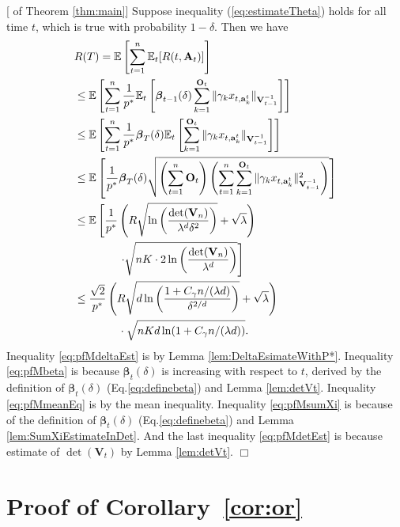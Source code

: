 \documentclass{article}
\newcommand{\bbeta}{\boldsymbol{\beta}}
\newcommand{\EE}{\mathbb{E}}
\newcommand{\bA}{\mathbf{A}}
\newcommand{\ba}{\mathbf{a}}
\newcommand{\bO}{\mathbf{O}}
\newcommand{\bV}{\mathbf{V}}
\newcommand{\norm}[1]{\| #1 \|}
\newenvironment{proof}{\noindent {\textbf{Proof. }}}{$\Box$ \medskip}
\begin{document}
\begin{proof}[ of Theorem \ref{thm:main}]
	Suppose inequality (\ref{eq:estimateTheta}) holds for all time $t$, which is true with probability $1-\delta$. Then we have
	\begin{align}
	&R(T) = \EE \left[\sum_{t=1}^{n} \EE_{t}[R(t, \bA_t)] \right] \notag\\
	&\leq \EE\left[\sum_{t=1}^{n} \frac{1}{p^*} \EE_t \left[\bbeta_{t-1}(\delta) \sum_{k=1}^{\bO_t}\norm{\gamma_k x_{t,\ba_k^t}}_{\bV_{t-1}^{-1}}\right] \right] \label{eq:pfMdeltaEst}\\
	&\leq \EE\left[\sum_{t=1}^{n} \frac{1}{p^*} \bbeta_{T}(\delta) \EE_t \left[ \sum_{k=1}^{\bO_t}\norm{\gamma_k x_{t,\ba_k^t}}_{\bV_{t-1}^{-1}}\right] \right] \label{eq:pfMbeta}\\
	&\leq \EE \left[\frac{1}{p^*} \bbeta_T(\delta) \sqrt{\left(\sum_{t=1}^{n} \bO_t\right) \left( \sum_{t=1}^{n} \sum_{k=1}^{\bO_t}\norm{\gamma_k x_{t,\ba_k^t}}_{\bV_{t-1}^{-1}}^2 \right)} \right ]  \label{eq:pfMmeanEq}\\
	&\leq \EE\left[\frac{1}{p^*} \left( R \sqrt{ \ln \left( \frac{\det(\bV_n)}{\lambda^d \delta^2} \right)} + \sqrt{\lambda} \right) \right. \notag\\
	& \left. \qquad \qquad \cdot \sqrt{nK \cdot 2\ln \left(\frac{\det(\bV_n)}{\lambda^d} \right)} \right] \label{eq:pfMsumXi}\\
	&\leq \frac{\sqrt{2}}{p^*} \left(R\sqrt{ d \ln \left( \frac{1 + C_\gamma n/(\lambda d)}{\delta^{2/d}} \right) } + \sqrt{\lambda} \right) \notag\\
	&\qquad \qquad \cdot \sqrt{nKd\ln(1 + C_\gamma n/(\lambda d))}. \label{eq:pfMdetEst}
	\end{align}
	Inequality \eqref{eq:pfMdeltaEst} is by Lemma \ref{lem:DeltaEsimateWithP*}. 
	Inequality \eqref{eq:pfMbeta} is because $\bbeta_{t}(\delta)$ is increasing with respect to $t$, derived by the definition of $\bbeta_t(\delta)$ (Eq.\eqref{eq:definebeta}) and Lemma \ref{lem:detVt}. 
	Inequality \eqref{eq:pfMmeanEq} is by the mean inequality. 
	Inequality \eqref{eq:pfMsumXi} is because of the definition of $\bbeta_t(\delta)$ (Eq.\eqref{eq:definebeta}) and Lemma \ref{lem:SumXiEstimateInDet}. 
	And the last inequality \eqref{eq:pfMdetEst} is because estimate of $\det(\bV_t)$ by Lemma \ref{lem:detVt}.
\end{proof}

\section{Proof of Corollary~\ref{cor:or}}
\end{document}
